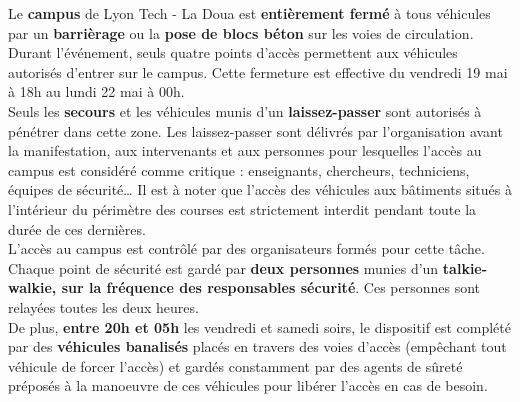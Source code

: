 \documentclass[hidelinks, paper=a4, fontsize=13pt]{report}
\begin{document}
Le \textbf{campus} de Lyon Tech - La Doua est \textbf{entièrement fermé} à tous véhicules par un \textbf{barrièrage} ou la \textbf{pose de blocs béton} sur les voies de circulation. Durant l'événement, seuls quatre points d'accès permettent aux véhicules autorisés d'entrer sur le campus.
Cette fermeture est effective du vendredi 19 mai à 18h au lundi 22 mai à 00h.\\

Seuls les \textbf{secours} et les véhicules munis d’un \textbf{laissez-passer} sont autorisés à pénétrer dans cette zone. Les laissez-passer sont délivrés par l'organisation avant la manifestation, aux intervenants et aux personnes pour lesquelles l’accès au campus est considéré comme critique : enseignants, chercheurs, techniciens, équipes de sécurité… Il est à noter que l’accès des véhicules aux bâtiments situés à l’intérieur du périmètre des courses est strictement interdit pendant toute la durée de ces dernières.\\

L’accès au campus est contrôlé par des organisateurs formés pour cette tâche. Chaque point de sécurité est gardé par \textbf{deux personnes} munies d’un \textbf{talkie-walkie, sur la fréquence des responsables sécurité}. Ces personnes sont relayées toutes les deux heures. \\
De plus, \textbf{entre 20h et 05h} les vendredi et samedi soirs, le dispositif est complété par des \textbf{véhicules banalisés} placés en travers des voies d'accès (empêchant tout véhicule de forcer l'accès) et gardés constamment par des agents de sûreté préposés à la manoeuvre de ces véhicules pour libérer l'accès en cas de besoin.\\
\end{document}
